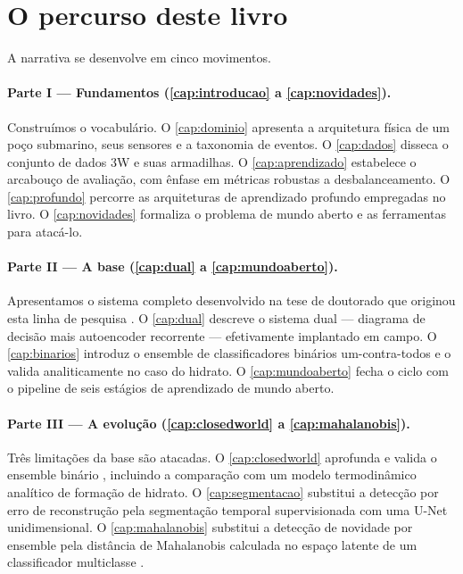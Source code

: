 \section{O percurso deste livro}

A narrativa se desenvolve em cinco movimentos.

\paragraph{Parte I --- Fundamentos (\cref{cap:introducao} a \cref{cap:novidades}).}
Construímos o vocabulário. O \cref{cap:dominio} apresenta a arquitetura física de um
poço submarino, seus sensores e a taxonomia de eventos. O \cref{cap:dados} disseca o
conjunto de dados 3W e suas armadilhas. O \cref{cap:aprendizado} estabelece o
arcabouço de avaliação, com ênfase em métricas robustas a desbalanceamento. O
\cref{cap:profundo} percorre as arquiteturas de aprendizado profundo empregadas no
livro. O \cref{cap:novidades} formaliza o problema de mundo aberto e as ferramentas
para atacá-lo.

\paragraph{Parte II --- A base (\cref{cap:dual} a \cref{cap:mundoaberto}).}
Apresentamos o sistema completo desenvolvido na tese de doutorado que originou esta
linha de pesquisa \citep{LopesTese2025}. O \cref{cap:dual} descreve o sistema dual ---
diagrama de decisão mais autoencoder recorrente --- efetivamente implantado em campo.
O \cref{cap:binarios} introduz o ensemble de classificadores binários um-contra-todos e
o valida analiticamente no caso do hidrato. O \cref{cap:mundoaberto} fecha o ciclo com
o pipeline de seis estágios de aprendizado de mundo aberto.

\paragraph{Parte III --- A evolução (\cref{cap:closedworld} a \cref{cap:mahalanobis}).}
Três limitações da base são atacadas. O \cref{cap:closedworld} aprofunda e valida o
ensemble binário \citep{Lopes2026PST}, incluindo a comparação com um modelo
termodinâmico analítico de formação de hidrato. O \cref{cap:segmentacao} substitui a
detecção por erro de reconstrução pela segmentação temporal supervisionada com uma
U-Net unidimensional. O \cref{cap:mahalanobis} substitui a detecção de novidade por
ensemble pela distância de Mahalanobis calculada no espaço latente de um classificador
multiclasse \citep{Lopes2026OTC}.

